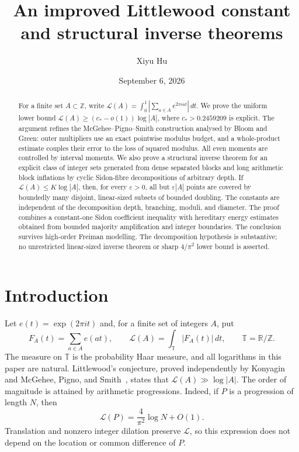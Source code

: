 \documentclass[11pt,reqno]{amsart}
\title[Littlewood constants and structural inverse theorems]{An improved Littlewood constant and structural inverse theorems}
\author{Xiyu Hu}
\date{September 6, 2026}
\numberwithin{equation}{section}
\theoremstyle{definition}
\theoremstyle{remark}
\newcommand{\Z}{\mathbb Z}
\newcommand{\R}{\mathbb R}
\newcommand{\T}{\mathbb T}
\newcommand{\La}{\mathcal L}
\newcommand{\eps}{\varepsilon}
\begin{document}
\begin{abstract}
For a finite set $A\subset\Z$, write
$\La(A)=\int_0^1|\sum_{a\in A}e^{2\pi iat}|\,dt$.
We prove the uniform lower bound
$\La(A)\ge(c_*-o(1))\log|A|$, where $c_*>0.2459209$ is explicit.
The argument refines the McGehee--Pigno--Smith construction analysed by
Bloom and Green: outer multipliers use an exact pointwise modulus budget,
and a whole-product estimate couples their error to the loss of squared
modulus. All even moments are controlled by interval moments.
We also prove a structural inverse theorem for an explicit class of integer
sets generated from dense separated blocks and long arithmetic block
inflations by cyclic Sidon-fibre decompositions of arbitrary depth.
If $\La(A)\le K\log|A|$, then, for every $\eps>0$, all but $\eps|A|$ points
are covered by boundedly many disjoint, linear-sized subsets of bounded
doubling. The constants are independent of the decomposition depth,
branching, moduli, and diameter. The proof combines a constant-one Sidon
coefficient inequality with hereditary energy estimates obtained from
bounded majority amplification and integer boundaries. The conclusion
survives high-order Freiman modelling. The decomposition hypothesis is
substantive; no unrestricted linear-sized inverse theorem or sharp
$4/\pi^2$ lower bound is asserted.
\end{abstract}
\maketitle
\tableofcontents
\newpage

\section{Introduction}
\label{sec:introduction}

Let $e(t)=\exp(2\pi it)$ and, for a finite set of integers $A$, put
\begin{equation}\label{eq:norm-definition}
 F_A(t)=\sum_{a\in A}e(at),\qquad
 \La(A)=\int_{\T}|F_A(t)|\,dt,\qquad \T=\R/\Z.
\end{equation}
The measure on $\T$ is the probability Haar measure, and all logarithms in
this paper are natural. Littlewood's conjecture, proved independently by
Konyagin~\cite{Konyagin} and McGehee, Pigno, and Smith~\cite{MPS}, states that
$\La(A)\gg\log|A|$. The order of magnitude is attained by arithmetic
progressions. Indeed, if $P$ is a progression of length $N$, then
\begin{equation}\label{eq:ap-asymptotic}
 \La(P)=\frac4{\pi^2}\log N+O(1).
\end{equation}
Translation and nonzero integer dilation preserve $\La$, so this expression
does not depend on the location or common difference of $P$.
\end{document}
